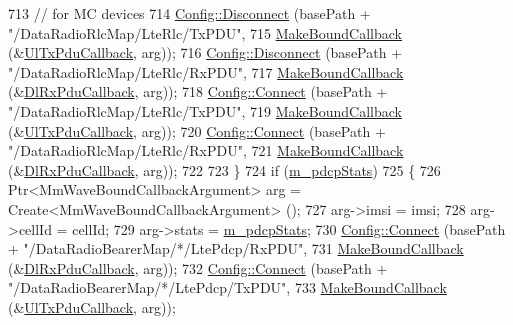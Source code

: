 \begin{DoxyCode}
713       \textcolor{comment}{// for MC devices}
714       \hyperlink{group__config_ga33e975bd2ed84e3353b2a3356d90fc1d}{Config::Disconnect} (basePath + \textcolor{stringliteral}{"/DataRadioRlcMap/LteRlc/TxPDU"},
715            \hyperlink{group__makeboundcallback_ga1725d6362e6065faa0709f7c93f8d770}{MakeBoundCallback} (&\hyperlink{namespacens3_ae624428f0992ac62a3c5f2e7318fb98e}{UlTxPduCallback}, arg));
716       \hyperlink{group__config_ga33e975bd2ed84e3353b2a3356d90fc1d}{Config::Disconnect} (basePath + \textcolor{stringliteral}{"/DataRadioRlcMap/LteRlc/RxPDU"},
717            \hyperlink{group__makeboundcallback_ga1725d6362e6065faa0709f7c93f8d770}{MakeBoundCallback} (&\hyperlink{namespacens3_ae4fb5123d8a56fce742428b530ec4197}{DlRxPduCallback}, arg));
718       \hyperlink{group__config_ga4014f151241cd0939b6cb64409605736}{Config::Connect} (basePath + \textcolor{stringliteral}{"/DataRadioRlcMap/LteRlc/TxPDU"},
719            \hyperlink{group__makeboundcallback_ga1725d6362e6065faa0709f7c93f8d770}{MakeBoundCallback} (&\hyperlink{namespacens3_ae624428f0992ac62a3c5f2e7318fb98e}{UlTxPduCallback}, arg));
720       \hyperlink{group__config_ga4014f151241cd0939b6cb64409605736}{Config::Connect} (basePath + \textcolor{stringliteral}{"/DataRadioRlcMap/LteRlc/RxPDU"},
721            \hyperlink{group__makeboundcallback_ga1725d6362e6065faa0709f7c93f8d770}{MakeBoundCallback} (&\hyperlink{namespacens3_ae4fb5123d8a56fce742428b530ec4197}{DlRxPduCallback}, arg));
722 
723     \}
724   \textcolor{keywordflow}{if} (\hyperlink{classns3_1_1MmWaveBearerStatsConnector_a6523c73cc057ed84faa3ddfc944ff67f}{m\_pdcpStats})
725     \{
726       Ptr<MmWaveBoundCallbackArgument> arg = Create<MmWaveBoundCallbackArgument> ();
727       arg->imsi = imsi;
728       arg->cellId = cellId; 
729       arg->stats = \hyperlink{classns3_1_1MmWaveBearerStatsConnector_a6523c73cc057ed84faa3ddfc944ff67f}{m\_pdcpStats};
730       \hyperlink{group__config_ga4014f151241cd0939b6cb64409605736}{Config::Connect} (basePath + \textcolor{stringliteral}{"/DataRadioBearerMap/*/LtePdcp/RxPDU"},
731                        \hyperlink{group__makeboundcallback_ga1725d6362e6065faa0709f7c93f8d770}{MakeBoundCallback} (&\hyperlink{namespacens3_ae4fb5123d8a56fce742428b530ec4197}{DlRxPduCallback}, arg));
732       \hyperlink{group__config_ga4014f151241cd0939b6cb64409605736}{Config::Connect} (basePath + \textcolor{stringliteral}{"/DataRadioBearerMap/*/LtePdcp/TxPDU"},
733                        \hyperlink{group__makeboundcallback_ga1725d6362e6065faa0709f7c93f8d770}{MakeBoundCallback} (&\hyperlink{namespacens3_ae624428f0992ac62a3c5f2e7318fb98e}{UlTxPduCallback}, arg));

\end{DoxyCode}
